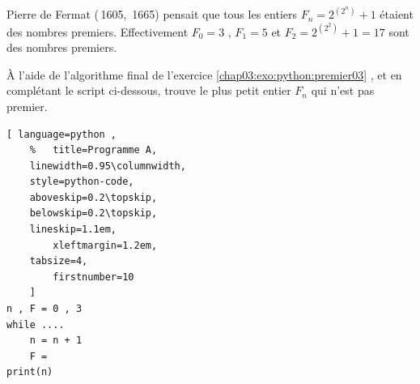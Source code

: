 \begin{exercise}\hfill 
  
Pierre de Fermat (\textborn\,1605, \textdied\,1665) pensait que tous les entiers $F_n= 2^{(2^n)}+1$ étaient des nombres premiers.  Effectivement $F_0=3$ , $F_1=5$ et $F_2=2^{(2^2)}+1=17$ sont des nombres premiers.
  
À l'aide de l'algorithme final de l'exercice \ref{chap03:exo:python:premier03} , et en complétant le script ci-dessous, trouve le plus petit entier $F_n$ qui n'est pas premier.
 
\noindent\begin{lstlisting}[ language=python , 
	%	title=Programme A,   
	linewidth=0.95\columnwidth,
	style=python-code,    
	aboveskip=0.2\topskip,
	belowskip=0.2\topskip,
	lineskip=1.1em,
		xleftmargin=1.2em,
	tabsize=4,
		firstnumber=10  
	]
n , F = 0 , 3
while ....
	n = n + 1
	F =
print(n)
\end{lstlisting} 
\end{exercise}
 

%	
